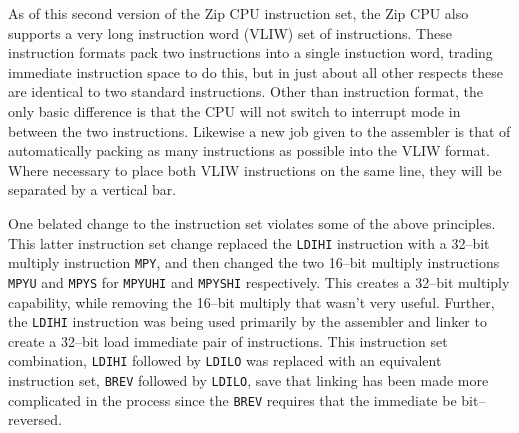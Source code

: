\documentclass{gqtekspec}
\begin{document}
As of this second version of the Zip CPU instruction set, the Zip CPU also
supports a very long instruction word (VLIW) set of instructions.   These
instruction formats pack two instructions into a single instuction word,
trading immediate instruction space to do this, but in just about all other
respects these are identical to two standard instructions.  Other than 
instruction format, the only basic difference is that the CPU will not switch
to interrupt mode in between the two instructions.  Likewise a new job given
to the assembler is that of automatically packing as many instructions as
possible into the VLIW format.  Where necessary to place both VLIW instructions
on the same line, they will be separated by a vertical bar.

One belated change to the instruction set violates some of the above
principles.  This latter instruction set change replaced the {\tt LDIHI}
instruction with a 32--bit multiply instruction {\tt MPY}, and then changed
the two 16--bit multiply instructions {\tt MPYU} and {\tt MPYS} for 
{\tt MPYUHI} and {\tt MPYSHI} respectively.  This creates a 32--bit 
multiply capability, while removing the 16--bit multiply that wasn't very
useful. Further, the {\tt LDIHI} instruction was being used primarily by the
assembler and linker to create a 32--bit load immediate pair of instructions.
This instruction set combination, {\tt LDIHI} followed by {\tt LDILO} was
replaced with an equivalent instruction set, {\tt BREV} followed by {\tt LDILO},
save that linking has been made more complicated in the process since the
{\tt BREV} requires that the immediate be bit--reversed.
\end{document}
